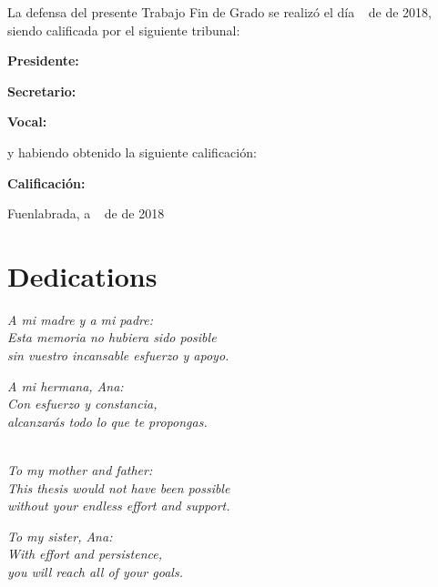 \documentclass[a4paper, 12pt]{book}
\begin{document}
\vspace{1cm}
La defensa del presente Trabajo Fin de Grado se realizó el día \qquad$\;\,$ de \qquad\qquad\qquad\qquad \newline de 2018, siendo calificada por el siguiente tribunal:


\vspace{0.5cm}
\textbf{Presidente:}

\vspace{1.2cm}
\textbf{Secretario:}

\vspace{1.2cm}
\textbf{Vocal:}


\vspace{1.2cm}
y habiendo obtenido la siguiente calificación:

\vspace{1cm}
\textbf{Calificación:}


\vspace{1cm}
\begin{flushright}
Fuenlabrada, a \qquad$\;\,$ de \qquad\qquad\qquad\qquad de 2018
\end{flushright}


\chapter*{Dedications}
\begin{flushright}
\textit{A mi madre y a mi padre:\\
Esta memoria no hubiera sido posible \\
sin vuestro incansable esfuerzo y apoyo.}
\end{flushright}
\par
\begin{flushright}
\textit{A mi hermana, Ana:\\
Con esfuerzo y constancia,\\
alcanzarás todo lo que te propongas.\\}
\end{flushright}
\begin{flushright}
\textit{\\To my mother and father:\\
This thesis would not have been possible\\
without your endless effort and support.}
\end{flushright}
\par
\begin{flushright}
\textit{To my sister, Ana:\\
With effort and persistence,\\
you will reach all of your goals.}
\end{flushright}
\end{document}
